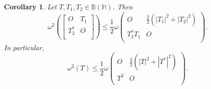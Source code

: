 \documentclass[12pt,twoside,reqno]{amsart}
\newtheorem{corollary}{Corollary}[section]
\numberwithin{equation}{section}
\begin{document}
\begin{corollary}\label{Cor_Block_two}
Let $T,{{T}_{1}},{{T}_{2}}\in \mathbb B\left( \mathbb H \right)$. Then 
	\[{{\omega }^{2}}\left( \left[ \begin{matrix}
   O & {{T}_{1}}  \\
   T_{2}^{*} & O  \\
\end{matrix} \right] \right)\le \frac{1}{2}\omega \left( \begin{matrix}
   O & \frac{3}{2}\left( {{\left| {{T}_{1}} \right|}^{2}}+{{\left| {{T}_{2}} \right|}^{2}} \right)  \\
   T_{2}^{*}{{T}_{1}} & O  \\
\end{matrix} \right).\]
In particular,
\[{{\omega }^{2}}\left( {{T}} \right)\le \frac{1}{2}\omega \left( \begin{matrix}
   O & \frac{3}{2}\left( {{\left| {{T}} \right|}^{2}}+{{\left| T^{*} \right|}^{2}} \right)  \\
   T^{2} & O  \\
\end{matrix} \right).\]
\end{corollary}
\end{document}

